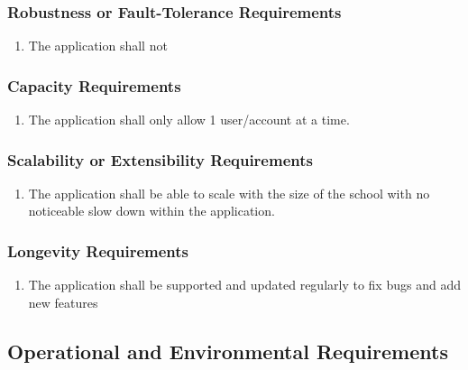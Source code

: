 \documentclass[]{article}
\begin{document}
\subsubsection{Robustness or Fault-Tolerance Requirements}
\label{ssub:robustness_or_fault_tolerance_requirements}
\begin{enumerate}[{PR}1. ]
	\item The application shall not 
\end{enumerate}

\subsubsection{Capacity Requirements}
\label{ssub:capacity_requirements}
\begin{enumerate}[{PR}1. ]
	\item The application shall only allow 1 user/account at a time.
\end{enumerate}

\subsubsection{Scalability or Extensibility Requirements}
\label{ssub:scalability_or_extensibility_requirements}
\begin{enumerate}[{PR}1. ]
	\item The application shall be able to scale with the size of the school with no noticeable slow down within the application.
\end{enumerate}

\subsubsection{Longevity Requirements}
\label{ssub:longevity_requirements}
\begin{enumerate}[{PR}1. ]
	\item The application shall be supported and updated regularly to fix bugs and
add new features
\end{enumerate}


\subsection{Operational and Environmental Requirements}
\label{sub:operational_and_environmental_requirements}
\end{document}
